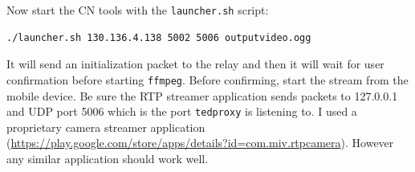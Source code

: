 \documentclass[a4paper]{article}
\begin{document}
Now start the CN tools with the \texttt{launcher.sh} script:
\begin{lstlisting}
./launcher.sh 130.136.4.138 5002 5006 outputvideo.ogg
\end{lstlisting}

It will send an initialization packet to the relay and then it will wait for user
confirmation before starting \texttt{ffmpeg}. Before confirming, start the
stream from the mobile device. Be sure the RTP streamer application sends
packets to 127.0.0.1 and UDP port 5006 which is the port \texttt{tedproxy} is
listening to. I used a proprietary camera streamer application
(\url{https://play.google.com/store/apps/details?id=com.miv.rtpcamera}).
However any similar application should work well.


\footnotesize

\end{document}
